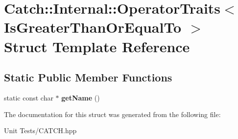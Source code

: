 \hypertarget{structCatch_1_1Internal_1_1OperatorTraits_3_01IsGreaterThanOrEqualTo_01_4}{}\section{Catch\+:\+:Internal\+:\+:Operator\+Traits$<$ Is\+Greater\+Than\+Or\+Equal\+To $>$ Struct Template Reference}
\label{structCatch_1_1Internal_1_1OperatorTraits_3_01IsGreaterThanOrEqualTo_01_4}
\subsection*{Static Public Member Functions}
\begin{DoxyCompactItemize}
\item 
static const char $\ast$ {\bfseries get\+Name} ()\hypertarget{structCatch_1_1Internal_1_1OperatorTraits_3_01IsGreaterThanOrEqualTo_01_4_a76b6f6b0dbaf7d19ebb1b4b4891e719e}{}\label{structCatch_1_1Internal_1_1OperatorTraits_3_01IsGreaterThanOrEqualTo_01_4_a76b6f6b0dbaf7d19ebb1b4b4891e719e}

\end{DoxyCompactItemize}


The documentation for this struct was generated from the following file\+:\begin{DoxyCompactItemize}
\item 
Unit Tests/C\+A\+T\+C\+H.\+hpp\end{DoxyCompactItemize}
